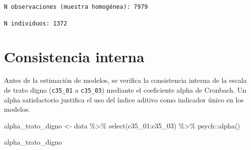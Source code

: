 \documentclass[
  spanish,
  a4paper,
  oneside]{scrbook}
\newenvironment{Shaded}{\begin{snugshade}}{\end{snugshade}}
\newcommand{\FunctionTok}[1]{\textcolor[rgb]{0.28,0.35,0.67}{#1}}
\newcommand{\NormalTok}[1]{\textcolor[rgb]{0.00,0.23,0.31}{#1}}
\newcommand{\OtherTok}[1]{\textcolor[rgb]{0.00,0.23,0.31}{#1}}
\newcommand{\SpecialCharTok}[1]{\textcolor[rgb]{0.37,0.37,0.37}{#1}}
\newcommand{\StringTok}[1]{\textcolor[rgb]{0.13,0.47,0.30}{#1}}
\begin{document}
\begin{verbatim}
N observaciones (muestra homogénea): 7979 
\end{verbatim}

\begin{Shaded}
\end{Shaded}

\begin{verbatim}
N individuos: 1372 
\end{verbatim}

\chapter{Consistencia interna}\label{consistencia-interna}

Antes de la estimación de modelos, se verifica la consistencia interna
de la escala de trato digno (\texttt{c35\_01} a \texttt{c35\_03})
mediante el coeficiente alpha de Cronbach. Un alpha satisfactorio
justifica el uso del índice aditivo como indicador único en los modelos.

\begin{Shaded}
\begin{Highlighting}[]
\NormalTok{alpha\_trato\_digno }\OtherTok{\textless{}{-}}\NormalTok{ data }\SpecialCharTok{\%\textgreater{}\%}
  \FunctionTok{select}\NormalTok{(c35\_01}\SpecialCharTok{:}\NormalTok{c35\_03) }\SpecialCharTok{\%\textgreater{}\%}
\NormalTok{  psych}\SpecialCharTok{::}\FunctionTok{alpha}\NormalTok{()}

\NormalTok{alpha\_trato\_digno}
\end{Highlighting}
\end{Shaded}
\end{document}
